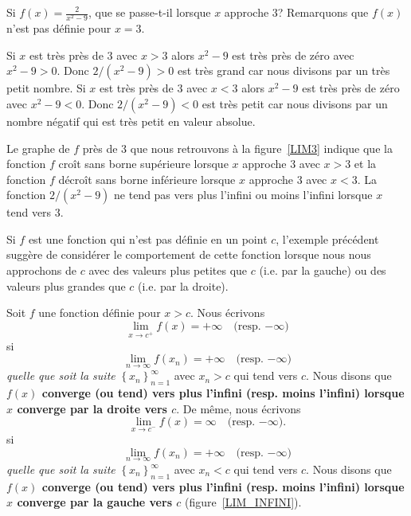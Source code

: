 {

\begin{egg}
Si $\displaystyle f(x) = \frac{2}{x^2-9}$, que se passe-t-il lorsque
$x$ approche $3$?  Remarquons que $f(x)$ n'est pas définie pour
$x=3$.

Si $x$ est très près de $3$ avec $x>3$ alors $x^2-9$ est très près de
zéro avec $x^2-9>0$.  Donc $2/(x^2-9)>0$ est très grand car nous divisons
par un très petit nombre.  Si $x$ est très près de $3$ avec $x<3$
alors $x^2-9$ est très près de zéro avec $x^2-9<0$.  Donc
$2/(x^2-9)<0$ est très petit car nous divisons par un nombre négatif qui
est très petit en valeur absolue.

Le graphe de $f$ près de $3$ que nous retrouvons à la figure~\ref{LIM3}
indique que la fonction $f$ croît sans borne supérieure lorsque $x$
approche $3$ avec $x>3$ et la fonction $f$ décroît sans borne
inférieure lorsque $x$ approche $3$ avec $x<3$.  La fonction
$2/(x^2-9)$ ne tend pas vers plus l'infini ou moins l'infini lorsque
$x$ tend vers $3$.
\end{egg}


Si $f$ est une fonction qui n'est pas définie en un point $c$,
l'exemple précédent suggère de considérer le comportement de cette
fonction lorsque nous nous approchons de $c$ avec des valeurs plus petites
que $c$ (i.e. par la gauche) ou des valeurs plus grandes que $c$ (i.e.
par la droite).

\begin{defn} 
Soit $f$ une fonction définie pour $x>c$.  Nous écrivons
\[
\lim_{x\rightarrow c^+} f(x) = +\infty  \quad \text{(resp. $-\infty$)}
\]
si
\[
\lim_{n\rightarrow \infty} f(x_n) = +\infty  \quad \text{(resp. $-\infty$)} 
\]
{\em quelle que soit la suite}
$\displaystyle \left\{x_n\right\}_{n=1}^\infty$ avec {\em $x_n >c$}
qui tend vers $c$.
Nous disons que {\bfseries $f(x)$ converge (ou tend) vers plus l'infini
(resp. moins l'infini) lorsque $x$ converge par la droite vers $c$}.
De même, nous écrivons
\[
\lim_{x\rightarrow c^-} f(x) = \infty \quad \text{(resp. $-\infty$)}.
\]
si
\[
\lim_{n\rightarrow \infty} f(x_n) = +\infty  \quad \text{(resp. $-\infty$)} 
\]
{\em quelle que soit la suite}
$\displaystyle \left\{x_n\right\}_{n=1}^\infty$ avec {\em $x_n <c$}
qui tend vers $c$.
Nous disons que {\bfseries $f(x)$ converge (ou tend) vers plus l'infini
(resp. moins l'infini) lorsque $x$ converge par la gauche vers $c$}
(figure~\ref{LIM_INFINI}).
\end{defn}

}
